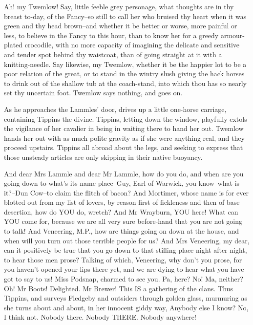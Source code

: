 Ah! my Twemlow! Say, little feeble grey personage, what thoughts are in
thy breast to-day, of the Fancy--so still to call her who bruised thy
heart when it was green and thy head brown--and whether it be better or
worse, more painful or less, to believe in the Fancy to this hour, than
to know her for a greedy armour-plated crocodile, with no more capacity
of imagining the delicate and sensitive and tender spot behind thy
waistcoat, than of going straight at it with a knitting-needle. Say
likewise, my Twemlow, whether it be the happier lot to be a poor
relation of the great, or to stand in the wintry slush giving the hack
horses to drink out of the shallow tub at the coach-stand, into which
thou has so nearly set thy uncertain foot. Twemlow says nothing, and
goes on.

As he approaches the Lammles’ door, drives up a little one-horse
carriage, containing Tippins the divine. Tippins, letting down the
window, playfully extols the vigilance of her cavalier in being in
waiting there to hand her out. Twemlow hands her out with as much polite
gravity as if she were anything real, and they proceed upstairs. Tippins
all abroad about the legs, and seeking to express that those unsteady
articles are only skipping in their native buoyancy.

And dear Mrs Lammle and dear Mr Lammle, how do you do, and when are
you going down to what’s-its-name place--Guy, Earl of Warwick, you
know--what is it?--Dun Cow--to claim the flitch of bacon? And Mortimer,
whose name is for ever blotted out from my list of lovers, by reason
first of fickleness and then of base desertion, how do YOU do, wretch?
And Mr Wrayburn, YOU here! What can YOU come for, because we are all
very sure before-hand that you are not going to talk! And Veneering,
M.P., how are things going on down at the house, and when will you turn
out those terrible people for us? And Mrs Veneering, my dear, can it
positively be true that you go down to that stifling place night after
night, to hear those men prose? Talking of which, Veneering, why don’t
you prose, for you haven’t opened your lips there yet, and we are dying
to hear what you have got to say to us! Miss Podsnap, charmed to see
you. Pa, here? No! Ma, neither? Oh! Mr Boots! Delighted. Mr Brewer!
This IS a gathering of the clans. Thus Tippins, and surveys Fledgeby and
outsiders through golden glass, murmuring as she turns about and about,
in her innocent giddy way, Anybody else I know? No, I think not. Nobody
there. Nobody THERE. Nobody anywhere!


